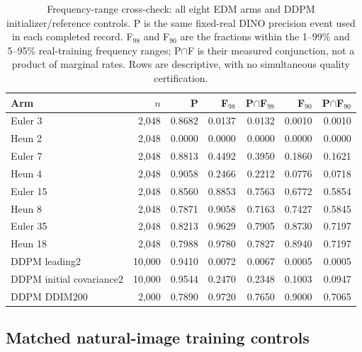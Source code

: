 \begin{table}[t]
\centering\small
\setlength{\tabcolsep}{4pt}
\caption{Frequency-range cross-check: all eight EDM arms and DDPM initializer/reference controls. P is the same fixed-real DINO precision event used in each completed record. F$_{98}$ and F$_{90}$ are the fractions within the 1--99\% and 5--95\% real-training frequency ranges; P$\cap$F is their measured conjunction, not a product of marginal rates. Rows are descriptive, with no simultaneous quality certification.}
\label{tab:additional_frequency}
\begin{tabular}{lrrrrrr}
\toprule
Arm & $n$ & P & F$_{98}$ & P$\cap$F$_{98}$ & F$_{90}$ & P$\cap$F$_{90}$ \\
\midrule
Euler 3 & 2,048 & 0.8682 & 0.0137 & 0.0132 & 0.0010 & 0.0010 \\
Heun 2 & 2,048 & 0.0000 & 0.0000 & 0.0000 & 0.0000 & 0.0000 \\
Euler 7 & 2,048 & 0.8813 & 0.4492 & 0.3950 & 0.1860 & 0.1621 \\
Heun 4 & 2,048 & 0.9058 & 0.2466 & 0.2212 & 0.0776 & 0.0718 \\
Euler 15 & 2,048 & 0.8560 & 0.8853 & 0.7563 & 0.6772 & 0.5854 \\
Heun 8 & 2,048 & 0.7871 & 0.9058 & 0.7163 & 0.7427 & 0.5845 \\
Euler 35 & 2,048 & 0.8213 & 0.9629 & 0.7905 & 0.8730 & 0.7197 \\
Heun 18 & 2,048 & 0.7988 & 0.9780 & 0.7827 & 0.8940 & 0.7197 \\
DDPM leading2 & 10,000 & 0.9410 & 0.0072 & 0.0067 & 0.0005 & 0.0005 \\
DDPM initial covariance2 & 10,000 & 0.9544 & 0.2470 & 0.2348 & 0.1003 & 0.0947 \\
DDPM DDIM200 & 2,000 & 0.7890 & 0.9720 & 0.7650 & 0.9000 & 0.7065 \\
\bottomrule
\end{tabular}
\end{table}

\subsection{Matched natural-image training controls}
